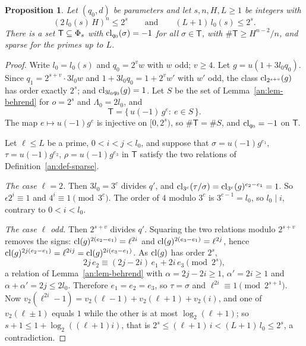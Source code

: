 \documentclass[10pt]{amsart}
\newtheorem{proposition}[theorem]{Proposition}
\theoremstyle{definition}
\theoremstyle{remark}
\begin{document}
\begin{proposition}\label{an:prop-sparse}
Let $(q_0,d)$ be parameters and let $s,n,H,L\ge1$ be integers with
\[
 (2\,l_0(s)\,H)^{n}\le2^{s}\qquad\text{and}\qquad(L+1)\,l_0(s)\le2^{s}.
\]
There is a set $\mathsf T\subseteq\Phi_s$ with $\mathrm{cl}_{q_0}(\sigma)=-1$ for
all $\sigma\in\mathsf T$, with $\#\mathsf T\ge H^{n-2}/n$, and sparse for the
primes up to $L$.
\end{proposition}
\begin{proof}
Write $l_0=l_0(s)$ and $q_0=2^{v}w$ with $w$ odd; $v\ge4$. Let
$g=u(1+3l_0q_0)$. Since $q_1=2^{s+v}\cdot3l_0w$ and $1+3l_0q_0=1+2^{v}w'$ with
$w'$ odd, the class $\mathrm{cl}_{2^{s+v}}(g)$ has order exactly $2^{s}$; and
$\mathrm{cl}_{3l_0q_0}(g)=1$. Let $S$ be the set of
Lemma~\ref{an:lem-behrend} for $o=2^{s}$ and $\Lambda_0=2l_0$, and
\[
 \mathsf T=\{\,u(-1)\,g^{e}:\ e\in S\,\}.
\]
The map $e\mapsto u(-1)g^{e}$ is injective on $[0,2^{s})$, so
$\#\mathsf T=\#S$, and $\mathrm{cl}_{q_0}=-1$ on $\mathsf T$.

Let $\ell\le L$ be a prime, $0<i<j<l_0$, and suppose that
$\sigma=u(-1)g^{e_1}$, $\tau=u(-1)g^{e_2}$, $\rho=u(-1)g^{e_3}$ in
$\mathsf T$ satisfy the two relations of Definition~\ref{an:def-sparse}.

\emph{The case $\ell=2$.} Then $3l_0=3^{c}$ divides $q'$, and
$\mathrm{cl}_{3^{c}}(\tau/\sigma)=\mathrm{cl}_{3^c}(g)^{e_2-e_1}=1$. So
$\epsilon2^{i}\equiv1$ and $4^{i}\equiv1\pmod{3^{c}}$. The order of $4$
modulo $3^{c}$ is $3^{c-1}=l_0$, so $l_0\mid i$, contrary to $0<i<l_0$.

\emph{The case $\ell$ odd.} Then $2^{s+v}$ divides $q'$. Squaring the two
relations modulo $2^{s+v}$ removes the signs:
$\mathrm{cl}(g)^{2(e_2-e_1)}=\ell^{2i}$ and $\mathrm{cl}(g)^{2(e_3-e_1)}=\ell^{2j}$, hence
$\mathrm{cl}(g)^{2j(e_2-e_1)}=\ell^{2ij}=\mathrm{cl}(g)^{2i(e_3-e_1)}$. As $\mathrm{cl}(g)$ has
order $2^{s}$,
\[
 2j\,e_2\equiv(2j-2i)\,e_1+2i\,e_3\pmod{2^{s}},
\]
a relation of Lemma~\ref{an:lem-behrend} with $\alpha=2j-2i\ge1$,
$\alpha'=2i\ge1$ and $\alpha+\alpha'=2j\le2l_0$. Therefore $e_1=e_2=e_3$,
so $\tau=\sigma$ and $\ell^{2i}\equiv1\pmod{2^{s+1}}$. Now
$v_2(\ell^{2i}-1)=v_2(\ell-1)+v_2(\ell+1)+v_2(i)$, and one of
$v_2(\ell\pm1)$ equals $1$ while the other is at most $\log_2(\ell+1)$; so
$s+1\le1+\log_2((\ell+1)i)$, that is
$2^{s}\le(\ell+1)\,i<(L+1)\,l_0\le2^{s}$, a contradiction.
\end{proof}
\end{document}
